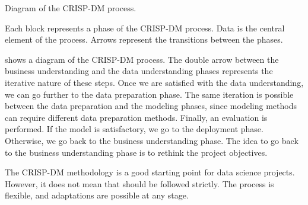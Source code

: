 \begin{figurebox}[label=fig:cripdm]{Diagram of the CRISP-DM process.}
  \centering
  \tcblower
  Each block represents a phase of the CRISP-DM process.  Data is the central element of
  the process.  Arrows represent the transitions between the phases.
\end{figurebox}

 shows a diagram of the CRISP-DM process.  The double arrow between the
business understanding and the data understanding phases represents the iterative nature
of these steps.  Once we are satisfied with the data understanding, we can go further to
the data preparation phase.  The same iteration is possible between the data preparation
and the modeling phases, since modeling methods can require different data preparation
methods. Finally, an evaluation is performed.  If the model is satisfactory, we go to the
deployment phase.  Otherwise, we go back to the business understanding phase.  The idea
to go back to the business understanding phase is to rethink the project objectives.%

The CRISP-DM methodology is a good starting point for data science projects.  However, it
does not mean that should be followed strictly.  The process is flexible, and
adaptations are possible at any stage.

